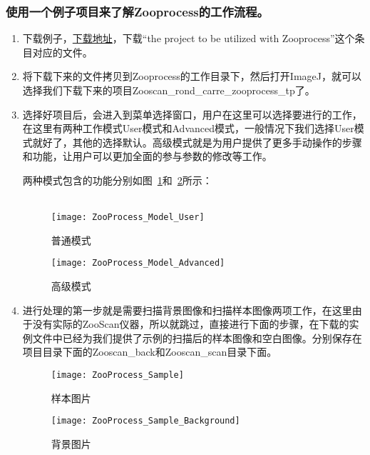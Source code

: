 	\subsubsection{使用一个例子项目来了解Zooprocess的工作流程。}
		\begin{enumerate}
			\item 下载例子，\href{http://www.obs-vlfr.fr/LOV/ZooPart/ZooScan/article.php3?id_article=219}{下载地址}，下载“the project to be utilized with Zooprocess”这个条目对应的文件。
			\item 将下载下来的文件拷贝到Zooprocess的工作目录下，然后打开ImageJ，就可以选择我们下载下来的项目Zooscan\_rond\_carre\_zooprocess\_tp了。
			\item 选择好项目后，会进入到菜单选择窗口，用户在这里可以选择要进行的工作，在这里有两种工作模式User模式和Advanced模式，一般情况下我们选择User模式就好了，其他的选择默认。高级模式就是为用户提供了更多手动操作的步骤和功能，让用户可以更加全面的参与参数的修改等工作。
			
			两种模式包含的功能分别如图~\ref{fig:UserModel}和~\ref{fig:AdvancedModel}所示：~\\\\
				\begin{figure}[!ht]
    					\centering
    					\texttt{[image: ZooProcess\_Model\_User]}
    					\caption{普通模式}
    					\label{fig:UserModel}
    				\end{figure}
				\begin{figure}[!ht]
    					\centering
    					\texttt{[image: ZooProcess\_Model\_Advanced]}
    					\caption{高级模式}
    					\label{fig:AdvancedModel}
    				\end{figure}
			
			\item 进行处理的第一步就是需要扫描背景图像和扫描样本图像两项工作，在这里由于没有实际的ZooScan仪器，所以就跳过，直接进行下面的步骤，在下载的实例文件中已经为我们提供了示例的扫描后的样本图像和空白图像。分别保存在项目目录下面的Zooscan\_back和Zooscan\_scan目录下面。
				\begin{figure}[!ht]
    					\centering
    					\texttt{[image: ZooProcess\_Sample]}
    					\caption{样本图片}
    					\label{fig:Sample}
    				\end{figure}
				\begin{figure}[!ht]
    					\centering
    					\texttt{[image: ZooProcess\_Sample\_Background]}
    					\caption{背景图片}
    					\label{fig:Background}
    				\end{figure}
				

\end{enumerate}
